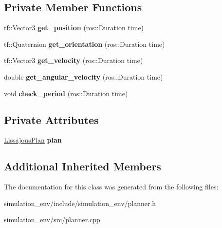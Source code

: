 \subsection*{Private Member Functions}
\begin{DoxyCompactItemize}
\item 
tf\+::\+Vector3 {\bfseries get\+\_\+position} (ros\+::\+Duration time)\hypertarget{classLissajousPlanner_aeb9a2e0f3cb8e651518bcd0dcd80bf2f}{}\label{classLissajousPlanner_aeb9a2e0f3cb8e651518bcd0dcd80bf2f}

\item 
tf\+::\+Quaternion {\bfseries get\+\_\+orientation} (ros\+::\+Duration time)\hypertarget{classLissajousPlanner_a07eb5dc306609dd6ae1f91e2738aee95}{}\label{classLissajousPlanner_a07eb5dc306609dd6ae1f91e2738aee95}

\item 
tf\+::\+Vector3 {\bfseries get\+\_\+velocity} (ros\+::\+Duration time)\hypertarget{classLissajousPlanner_a17a85db0fe0f380164297b8365232ab2}{}\label{classLissajousPlanner_a17a85db0fe0f380164297b8365232ab2}

\item 
double {\bfseries get\+\_\+angular\+\_\+velocity} (ros\+::\+Duration time)\hypertarget{classLissajousPlanner_ab7ef88484995f3fd223c8dcbd6f86a8e}{}\label{classLissajousPlanner_ab7ef88484995f3fd223c8dcbd6f86a8e}

\item 
void {\bfseries check\+\_\+period} (ros\+::\+Duration time)\hypertarget{classLissajousPlanner_a9001fcfa7f1d25e4ae7826499b0b2ebc}{}\label{classLissajousPlanner_a9001fcfa7f1d25e4ae7826499b0b2ebc}

\end{DoxyCompactItemize}
\subsection*{Private Attributes}
\begin{DoxyCompactItemize}
\item 
\hyperlink{structLissajousPlanner_1_1LissajousPlan}{Lissajous\+Plan} {\bfseries plan}\hypertarget{classLissajousPlanner_ac3365f9d9d84307b680a94cff01edd9b}{}\label{classLissajousPlanner_ac3365f9d9d84307b680a94cff01edd9b}

\end{DoxyCompactItemize}
\subsection*{Additional Inherited Members}


The documentation for this class was generated from the following files\+:\begin{DoxyCompactItemize}
\item 
simulation\+\_\+env/include/simulation\+\_\+env/planner.\+h\item 
simulation\+\_\+env/src/planner.\+cpp\end{DoxyCompactItemize}
